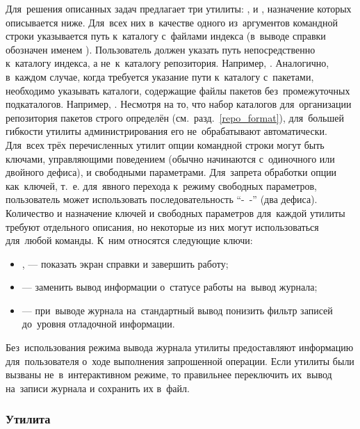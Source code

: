 Для~решения описанных задач \ds предлагает три утилиты:
,
 и
,
назначение которых описывается ниже.
Для~всех них в~качестве одного из~аргументов командной строки указывается путь к~каталогу с~файлами индекса (в~выводе справки обозначен именем ).
Пользователь должен указать путь непосредственно к~каталогу индекса,
а не~к~каталогу репозитория. 
Например, . 
Аналогично, в~каждом случае, когда требуется указание пути к~каталогу с~пакетами, необходимо указывать каталоги,
содержащие файлы пакетов без~промежуточных подкаталогов.
Например, .
Несмотря на то, что набор каталогов для~организации репозитория пакетов \ds строго определён (см.~разд.~\ref{repo_format}),
для~большей гибкости  утилиты администрирования  его не~обрабатывают автоматически.
Для~всех трёх перечисленных утилит опции командной строки могут быть ключами, управляющими поведением (обычно начинаются с~одиночного или двойного дефиса), и свободными параметрами.
Для~запрета обработки опции как~ключей, т.~е. для~явного перехода к~режиму свободных параметров,
 пользователь может использовать последовательность ``-~-'' (два дефиса). %
Количество и назначение ключей и свободных параметров для~каждой утилиты требуют отдельного   описания,
но некоторые из них могут использоваться для~любой команды. 
К~ним относятся следующие ключи:

\begin{itemize}

\item {
,  --- показать экран справки и завершить работу; %
}

\item {
 --- заменить вывод информации о~статусе работы на~вывод журнала; %
}

\item {
 --- при~выводе журнала  на~стандартный вывод понизить фильтр записей до~уровня отладочной информации. %
}

\end{itemize}

Без~использования режима вывода журнала утилиты предоставляют информацию для~пользователя о~ходе выполнения запрошенной операции.
Если утилиты были вызваны не~в~интерактивном режиме, то правильнее переключить их~вывод на~записи журнала и сохранить их в~файл. 

\subsubsection{Утилита }

